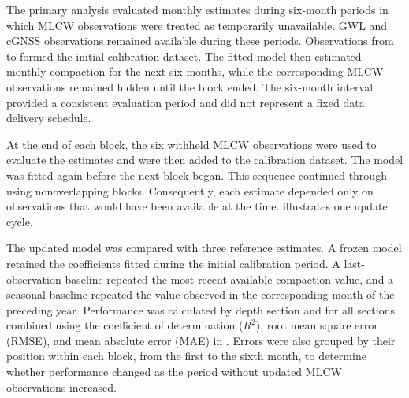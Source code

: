 The primary analysis evaluated monthly estimates during six-month periods in which MLCW observations were treated as temporarily unavailable. GWL and cGNSS observations remained available during these periods. Observations from  to  formed the initial calibration dataset. The fitted model then estimated monthly compaction for the next six months, while the corresponding MLCW observations remained hidden until the block ended. The six-month interval provided a consistent evaluation period and did not represent a fixed data delivery schedule.

At the end of each block, the six withheld MLCW observations were used to evaluate the estimates and were then added to the calibration dataset. The model was fitted again before the next block began. This sequence continued through  using nonoverlapping blocks. Consequently, each estimate depended only on observations that would have been available at the time.  illustrates one update cycle.

The updated model was compared with three reference estimates. A frozen model retained the coefficients fitted during the initial calibration period. A last-observation baseline repeated the most recent available compaction value, and a seasonal baseline repeated the value observed in the corresponding month of the preceding year. Performance was calculated by depth section and for all sections combined using the coefficient of determination ($R^2$), root mean square error (RMSE), and mean absolute error (MAE) in . Errors were also grouped by their position within each block, from the first to the sixth month, to determine whether performance changed as the period without updated MLCW observations increased.

